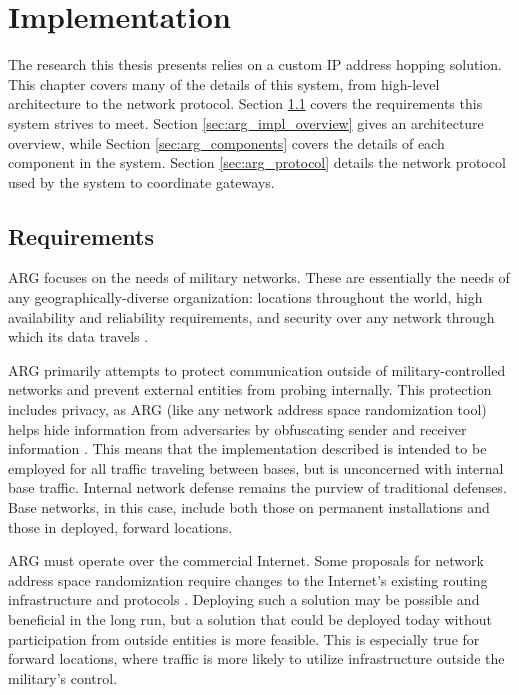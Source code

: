 \chapter{Implementation}
\label{chp:implementation}

\par The research this thesis presents relies on a custom \ac{IP} address hopping solution. This chapter covers many of the details of this system, from high-level architecture to the network protocol. Section \ref{sec:arg_requirements} covers the requirements this system strives to meet. Section \ref{sec:arg_impl_overview} gives an architecture overview, while Section \ref{sec:arg_components} covers the details of each component in the system. Section \ref{sec:arg_protocol} details the network protocol used by the system to coordinate gateways.

\section{Requirements}
\label{sec:arg_requirements}
\par \ac{ARG} focuses on the needs of military networks. These are essentially the needs of any geographically-diverse organization: locations throughout the world, high availability and reliability requirements, and security over any network through which its data travels \cite{DialInNetworking}.

\par ARG primarily attempts to protect communication outside of military-controlled networks and prevent external entities from probing internally. This protection includes privacy, as \ac{ARG} (like any network address space randomization tool) helps hide information from adversaries by obfuscating sender and receiver information \cite{NetworkBasedPrivacy}. This means that the implementation described is intended to be employed for all traffic traveling between bases, but is unconcerned with internal base traffic. Internal network defense remains the purview of traditional defenses. Base networks, in this case, include both those on permanent installations and those in deployed, forward locations. 

\par ARG must operate over the commercial Internet. Some proposals for network address space randomization require changes to the Internet's existing routing infrastructure and protocols \cite{CONTRA, APOD}. Deploying such a solution may be possible and beneficial in the long run, but a solution that could be deployed today without participation from outside entities is more feasible. This is especially true for forward locations, where traffic is more likely to utilize infrastructure outside the military's control.

